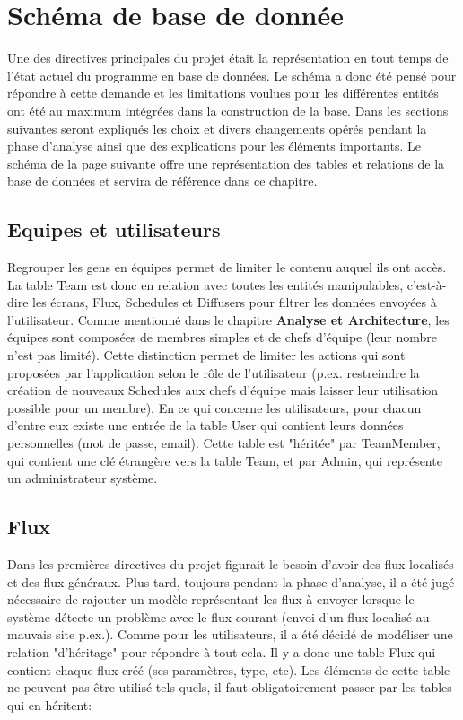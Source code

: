 \documentclass[french]{article}
\begin{document}
\newpage
\section{Schéma de base de donnée}
Une des directives principales du projet était la représentation en tout temps de l'état actuel du programme en base de données. Le schéma a donc été pensé pour répondre à cette demande et les limitations voulues pour les différentes entités ont été au maximum intégrées dans la construction de la base. Dans les sections suivantes seront expliqués les choix et divers changements opérés pendant la phase d'analyse ainsi que des explications pour les éléments importants. Le schéma de la page suivante offre une représentation des tables et relations de la base de données et servira de référence dans ce chapitre.

\subsection{Equipes et utilisateurs}

Regrouper les gens en équipes permet de limiter le contenu auquel ils ont accès. La table Team est donc en relation avec toutes les entités manipulables, c'est-à-dire les écrans, Flux, Schedules et Diffusers pour filtrer les données envoyées à l'utilisateur. Comme mentionné dans le chapitre \textbf{Analyse et Architecture}, les équipes sont composées de membres simples et de chefs d'équipe (leur nombre n'est pas limité). Cette distinction permet de limiter les actions qui sont proposées par l'application selon le rôle de l'utilisateur (p.ex. restreindre la création de nouveaux Schedules aux chefs d'équipe mais laisser leur utilisation possible pour un membre). \newline
En ce qui concerne les utilisateurs, pour chacun d'entre eux existe une entrée de la table User qui contient leurs données personnelles (mot de passe, email). Cette table est "héritée" par TeamMember, qui contient une clé étrangère vers la table Team, et par Admin, qui représente un administrateur système. 

\subsection{Flux}

Dans les premières directives du projet figurait le besoin d'avoir des flux localisés et des flux généraux. Plus tard, toujours pendant la phase d'analyse, il a été jugé nécessaire de rajouter un modèle représentant les flux à envoyer lorsque le système détecte un problème avec le flux courant (envoi d'un flux localisé au mauvais site p.ex.). Comme pour les utilisateurs, il a été décidé de modéliser une relation "d'héritage" pour répondre à tout cela. Il y a donc une table Flux qui contient chaque flux créé (ses paramètres, type, etc). Les éléments de cette table ne peuvent pas être utilisé tels quels, il faut obligatoirement passer par les tables qui en héritent: 
\end{document}
